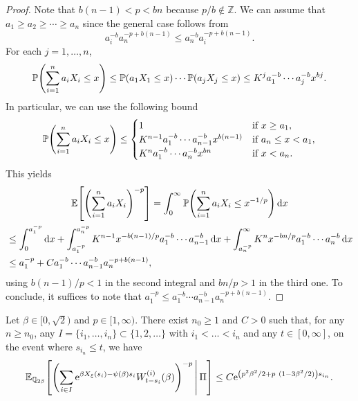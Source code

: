 \documentclass[AHL,Unicode,longabstracts,published]{cedram}
\newcommand{\e}{\mathrm{e}}
\renewcommand{\d}[1]{\mathop{}\!\mathrm{d}#1}
\newcommand{\E}{\mathbb{E}}
\renewcommand{\P}{\mathbb{P}}
\newcommand{\Q}{\mathbb{Q}}
\newcommand{\Z}{\mathbb{Z}}
\newcommand\1{\mathds{1}}
\newcommand{\Expec}[1]{\mathbb{E}\left[#1\right]}
\let\originalleft\left
\let\originalright\right
\renewcommand{\left}{\mathopen{}\mathclose\bgroup\originalleft}
\renewcommand{\right}{\aftergroup\egroup\originalright}
\begin{document}
\begin{proof}
Note that $b(n - 1) < p < bn$ because $p/b \notin \Z$. We can assume that $a_1 \geq a_2 \geq \cdots \geq a_n$ since the general case follows from
\begin{equation*}
a_i^{-b} a_n^{-p + b(n - 1)} \leq a_n^{-b} a_i^{-p + b(n - 1)}.
\end{equation*}
For each $j = 1, \dots, n$,
\begin{equation*}
\P \left(\sum_{i = 1}^n a_i X_i \leq x \right) \leq \P\left(a_1 X_1 \leq x\right) \cdots \P\left(a_j X_j \leq x\right) \leq K^j a_1^{-b} \cdots a_j^{-b} x^{bj}.
\end{equation*}
In particular, we can use the following bound
\begin{equation*}
\P \left(\sum_{i = 1}^n a_i X_i \leq x \right) \leq
\begin{cases}
1 & \text{if } x \geq a_1, \\
K^{n - 1} a_1^{-b} \cdots a_{n-1}^{-b} x^{b(n-1)} & \text{if } a_n \leq x < a_1, \\
K^n a_1^{-b} \cdots a_n^{-b} x^{bn} & \text{if } x < a_n.
\end{cases}
\end{equation*}
This yields
\begin{multline*}
\Expec{\left(\sum_{i = 1}^n a_i X_i \right)^{-p}} = \int_0^\infty \P \left(\sum_{i = 1}^n a_i X_i \leq x^{-1/p} \right) \d{x}  \\
\begin{aligned}
&\leq \int_0^{a_1^{-p}} \d{x} + \int_{a_1^{-p}}^{a_n^{-p}} K^{n - 1} x^{-b(n-1)/p} a_1^{-b} \cdots a_{n-1}^{-b} \d{x} + \int_{a_n^{-p}}^\infty K^n x^{-bn/p} a_1^{-b} \cdots a_n^{-b} \d{x}  \\
&\leq a_1^{-p} + C a_1^{-b} \cdots a_{n - 1}^{-b} a_n^{-p + b(n-1)},
\end{aligned}
\end{multline*}
using $b(n-1)/p<1$ in the second integral and $bn/p >1$ in the third one. To conclude, it suffices to note that $a_1^{-p} \leq a_1^{-b} \cdots a_{n-1}^{-b} a_n^{-p + b(n-1)}$.
\end{proof}


\begin{lemm}\label{lem:bound_for_negative_moments}
Let $\beta \in [0, \sqrt{2})$ and $p \in [1, \infty)$. There exist $n_0\geq 1$ and $C > 0$ such that, for any $n \geq n_0$, any $I = \{i_1, \dots, i_n\} \subset \{1, 2, \dots\}$ with $i_1 < \dots < i_n$ and any $t \in [0, \infty]$, on the event where $s_{i_n} \leq t$, we have
\begin{equation}\label{eq:bound_for_negative_moments}
\E_{\Q_{2\beta}} \left[\left(\sum_{i \in I} \e^{\beta X_\xi(s_i) - \psi(\beta)s_i} W_{t - s_i}^{(i)}(\beta) \right)^{-p} \,\middle|\, \Pi \right] \leq C \e^{\left(p^2\beta^2/2 + p~(1 - 3\beta^2/2)\right)s_{i_n}}.
\end{equation}
\end{lemm}
\end{document}
